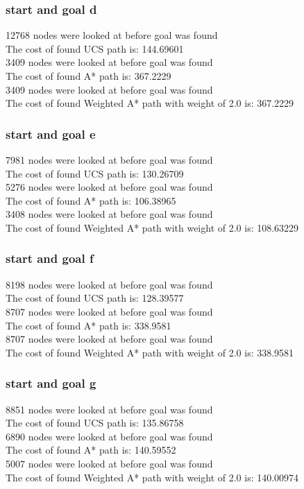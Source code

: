 \documentclass[11pt]{article} %
\begin{document}
\subsubsection{start and goal d}
12768 nodes were looked at before goal was found\\
The cost of found UCS path is: 144.69601\\
3409 nodes were looked at before goal was found\\
The cost of found A* path is: 367.2229\\
3409 nodes were looked at before goal was found\\
The cost of found Weighted A* path with weight of 2.0 is: 367.2229\\
\subsubsection{start and goal e}
7981 nodes were looked at before goal was found\\
The cost of found UCS path is: 130.26709\\
5276 nodes were looked at before goal was found\\
The cost of found A* path is: 106.38965\\
3408 nodes were looked at before goal was found\\
The cost of found Weighted A* path with weight of 2.0 is: 108.63229\\
\subsubsection{start and goal f}
8198 nodes were looked at before goal was found\\
The cost of found UCS path is: 128.39577\\
8707 nodes were looked at before goal was found\\
The cost of found A* path is: 338.9581\\
8707 nodes were looked at before goal was found\\
The cost of found Weighted A* path with weight of 2.0 is: 338.9581\\
\subsubsection{start and goal g}
8851 nodes were looked at before goal was found\\
The cost of found UCS path is: 135.86758\\
6890 nodes were looked at before goal was found\\
The cost of found A* path is: 140.59552\\
5007 nodes were looked at before goal was found\\
The cost of found Weighted A* path with weight of 2.0 is: 140.00974\\
\end{document}

